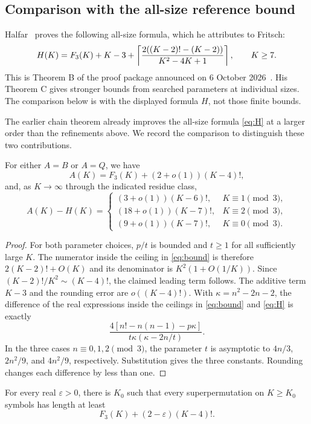 \subsection{Comparison with the all-size reference bound}

Halfar~\cite{halfar} proves the following all-size formula, which he
attributes to Fritsch:
\begin{equation}\label{eq:H}
 H(K)=F_3(K)+K-3+
 \left\lceil \frac{2((K-2)!-(K-2))}{K^2-4K+1}\right\rceil,\qquad K\ge7.
\end{equation}
This is Theorem B of the proof package announced on 6 October
2026~\cite{halfar-announcement}. His Theorem C gives stronger bounds
from searched parameters at individual sizes. The comparison below
is with the displayed formula $H$, not those finite bounds.

The earlier chain theorem already improves the all-size formula
\eqref{eq:H} at a larger order than the refinements above. We record
the comparison to distinguish these two contributions.

\begin{corollary}\label{cor:comparison}
For either $A=B$ or $A=Q$, we have
\[
 A(K)=F_3(K)+(2+o(1))(K-4)!,
\]
and, as $K\to\infty$ through the indicated residue class,
\[
 A(K)-H(K)=
 \begin{cases}
 (3+o(1))(K-6)!,&K\equiv1\pmod3,\\
 (18+o(1))(K-7)!,&K\equiv2\pmod3,\\
 (9+o(1))(K-7)!,&K\equiv0\pmod3.
 \end{cases}
\]
\end{corollary}

\begin{proof}
For both parameter choices, $p/t$ is bounded and $t\ge1$ for all
sufficiently large $K$. The numerator inside the ceiling in
\eqref{eq:bound} is therefore $2(K-2)!+O(K)$ and its denominator is
$K^2(1+O(1/K))$. Since $(K-2)!/K^2\sim(K-4)!$, the claimed leading
term follows. The additive term $K-3$ and the rounding error are
$o((K-4)!)$.
With $\kappa=n^2-2n-2$, the difference of the real expressions
inside the ceilings in \eqref{eq:bound} and \eqref{eq:H} is exactly
\[
 \frac{4[n!-n(n-1)-p\kappa]}{t\kappa(\kappa-2n/t)}.
\]
In the three cases $n\equiv0,1,2\pmod3$, the parameter $t$ is
asymptotic to $4n/3$, $2n^2/9$, and $4n^2/9$, respectively.
Substitution gives the three constants. Rounding changes each
difference by less than one.
\end{proof}

\begin{corollary}\label{cor:word-asymptotic}
For every real $\varepsilon>0$, there is $K_0$ such that every
superpermutation on $K\ge K_0$ symbols has length at least
\[
 F_3(K)+(2-\varepsilon)(K-4)!.
\]
\end{corollary}

